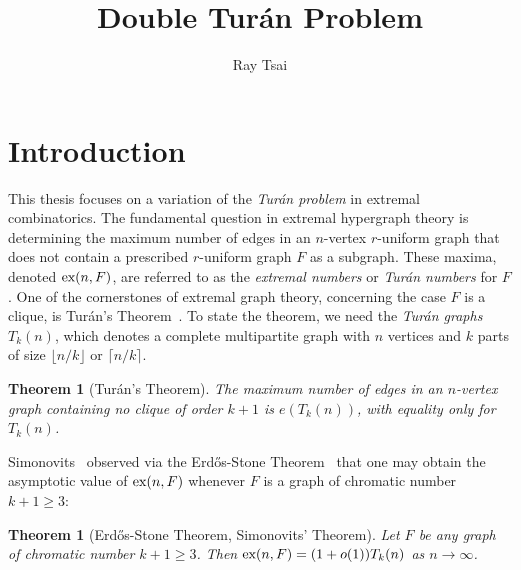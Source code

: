\documentclass[12pt]{article}
\title{Double Turán Problem}
\author{Ray Tsai}
\newcounter{foo}
\newtheorem{oldtheorem}[foo]{Theorem}
\newcommand*{\ex}{\textnormal{ex}}
\begin{document}
\maketitle



\tableofcontents

\newpage

\section{Introduction}

This thesis focuses on a variation of the \textit{Turán problem} in extremal combinatorics.  The fundamental question in extremal hypergraph theory is determining the maximum number of edges in an $n$-vertex $r$-uniform graph that does not contain a prescribed $r$-uniform graph $F$ as a subgraph. These maxima, denoted $\ex(n, F)$, are referred to as the \textit{extremal numbers} or \textit{Turán numbers} for $F$. One of the cornerstones of extremal graph theory, concerning the case $F$ is a clique, is Tur\'{a}n's Theorem~\cite{Turan1941}. To state the theorem, we need the \textit{Tur\'{a}n graphs} $T_k(n)$, which denotes a complete multipartite graph with $n$ vertices and $k$ parts of size $\lfloor n/k\rfloor$ or $\lceil n/k\rceil$. 

\begin{oldtheorem}[Tur\'{a}n's Theorem]\label{thm:turan}
The maximum number of edges in an $n$-vertex graph containing no clique of order $k + 1$ is $e(T_k(n))$, with equality only for $T_k(n)$.
\end{oldtheorem}

Simonovits~\cite{ErdosSimonovits1966} observed via the Erd\H{o}s-Stone Theorem~\cite{ErdosStone1946} that one may obtain the asymptotic value of $\ex(n,F)$ whenever $F$ is a graph of chromatic number $k + 1\geq 3$:

\begin{oldtheorem}[Erd\H{o}s-Stone Theorem, Simonovits' Theorem]\label{thm:ess}
Let $F$ be any graph of chromatic number $k + 1 \geq 3$. Then $\ex(n,F) = (1 + o(1))T_k(n)$ as $n \rightarrow \infty$.
\end{oldtheorem}
\end{document}

